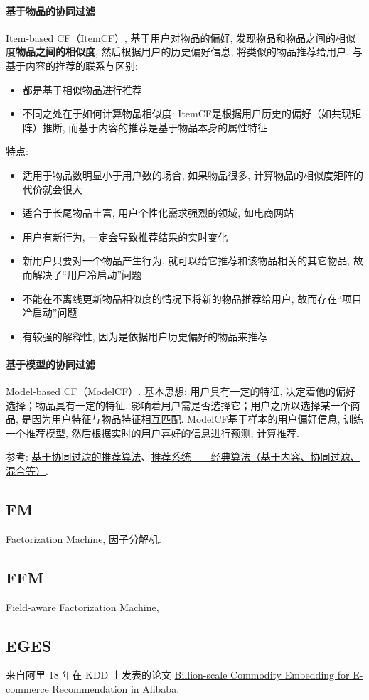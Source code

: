 \paragraph{基于物品的协同过滤}
Item-based CF（ItemCF）, 基于用户对物品的偏好, 发现物品和物品之间的相似度\textbf{物品之间的相似度}, 然后根据用户的历史偏好信息, 将类似的物品推荐给用户. 与基于内容的推荐的联系与区别: 
\begin{itemize}
	\item 都是基于相似物品进行推荐
	\item 不同之处在于如何计算物品相似度: ItemCF是根据用户历史的偏好（如共现矩阵）推断, 而基于内容的推荐是基于物品本身的属性特征
\end{itemize}
特点: 
\begin{itemize}
	\item 适用于物品数明显小于用户数的场合, 如果物品很多, 计算物品的相似度矩阵的代价就会很大
	\item 适合于长尾物品丰富, 用户个性化需求强烈的领域, 如电商网站
	\item 用户有新行为, 一定会导致推荐结果的实时变化
	\item 新用户只要对一个物品产生行为, 就可以给它推荐和该物品相关的其它物品, 故而解决了“用户冷启动”问题
	\item 不能在不离线更新物品相似度的情况下将新的物品推荐给用户, 故而存在“项目冷启动”问题
	\item 有较强的解释性, 因为是依据用户历史偏好的物品来推荐
\end{itemize}


\paragraph{基于模型的协同过滤}
Model-based CF（ModelCF）. 基本思想: 用户具有一定的特征, 决定着他的偏好选择；物品具有一定的特征, 影响着用户需是否选择它；用户之所以选择某一个商品, 是因为用户特征与物品特征相互匹配. ModelCF基于样本的用户偏好信息, 训练一个推荐模型, 然后根据实时的用户喜好的信息进行预测, 计算推荐. 

参考: \href{https://www.cnblogs.com/shengyang17/p/11516532.html}{基于协同过滤的推荐算法}、\href{https://zhuanlan.zhihu.com/p/108759393}{推荐系统——经典算法（基于内容、协同过滤、混合等）}. 




\subsection{FM}
Factorization Machine, 因子分解机. 

\subsection{FFM}
Field-aware Factorization Machine, 

\subsection{EGES}
来自阿里 18 年在 KDD 上发表的论文 \href{https://arxiv.org/pdf/1803.02349.pdf}{Billion-scale Commodity Embedding for E-commerce	Recommendation in Alibaba}.